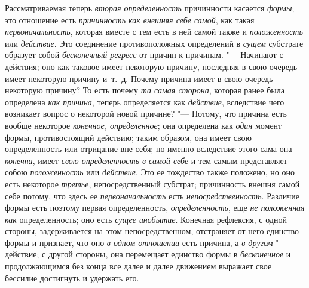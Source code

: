 Рассматриваемая теперь {\em вторая определенность}
причинности касается {\em формы}; это отношение есть
{\em причинность как внешняя себе самой}, как такая
{\em первоначальность}, которая вместе с тем есть в ней
самой также и {\em положенность} или
{\em действие}. Это соединение противоположных
определений в {\em сущем} субстрате образует собой
{\em бесконечный регресс} от причин к причинам. "---
Начинают с действия; оно как таковое имеет некоторую причину, последняя в
свою очередь имеет некоторую причину и~т.~д. Почему причина имеет в свою
очередь некоторую причину? То есть почему {\em та самая
сторона}, которая ранее была определена {\em как
причина}, теперь определяется как {\em действие},
вследствие чего возникает вопрос о некоторой новой причине? "--- Потому, что
причина есть вообще некоторое {\em конечное,
определенное}; она определена как {\em один} момент
формы, противостоящий действию; таким образом, она имеет свою
определенность или отрицание вне себя; но именно вследствие этого сама она
{\em конечна}, имеет {\em свою
определенность в самой себе} и тем самым представляет собою
{\em положенность} или
{\em действие}. Это ее тождество также положено, но оно
есть некоторое {\em третье}, непосредственный субстрат;
причинность внешня самой себе потому, что здесь ее
{\em первоначальность} есть
{\em непосредственность}. Различие формы есть поэтому
первая определенность, {\em определенность}, еще
{\em не положенная как} определенность; оно есть
{\em сущее инобытие}. Конечная рефлексия, с одной
стороны, задерживается на этом непосредственном, отстраняет от него
единство формы и признает, что оно {\em в одном
отношении} есть причина, а {\em в другом} "--- действие; с
другой стороны, она перемещает единство формы в
{\em бесконечное} и продолжающимся без конца все далее
и далее движением выражает свое бессилие достигнуть и удержать его.

